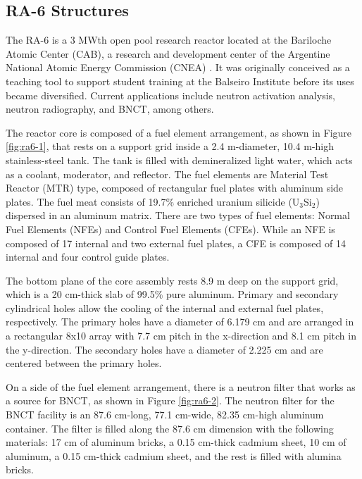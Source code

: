 \subsection{RA-6 Structures}

The RA-6 is a 3 MWth open pool research reactor located at the Bariloche Atomic Center (CAB), a research and development center of the Argentine National Atomic Energy Commission (CNEA) \cite{ICSBEP}.
It was originally conceived as a teaching tool to support student training at the Balseiro Institute before its uses became diversified.
Current applications include neutron activation analysis, neutron radiography, and \gls*{BNCT}, among others.

The reactor core is composed of a fuel element arrangement, as shown in Figure \ref{fig:ra6-1}, that rests on a support grid inside a 2.4 m-diameter, 10.4 m-high stainless-steel tank.
The tank is filled with demineralized light water, which acts as a coolant, moderator, and reflector.
The fuel elements are Material Test Reactor (MTR) type, composed of rectangular fuel plates with aluminum side plates.
The fuel meat consists of 19.7\% enriched uranium silicide (U$_3$Si$_2$) dispersed in an aluminum matrix.
There are two types of fuel elements: Normal Fuel Elements (NFEs) and Control Fuel Elements (CFEs).
While an NFE is composed of 17 internal and two external fuel plates, a CFE is composed of 14 internal and four control guide plates.

The bottom plane of the core assembly rests 8.9 m deep on the support grid, which is a 20 cm-thick slab of 99.5\% pure aluminum.
Primary and secondary cylindrical holes allow the cooling of the internal and external fuel plates, respectively.
The primary holes have a diameter of 6.179 cm and are arranged in a rectangular 8x10 array with 7.7 cm pitch in the x-direction and 8.1 cm pitch in the y-direction.
The secondary holes have a diameter of 2.225 cm and are centered between the primary holes.

On a side of the fuel element arrangement, there is a neutron filter that works as a source for \gls*{BNCT}, as shown in Figure \ref{fig:ra6-2}.
The neutron filter for the \gls*{BNCT} facility is an 87.6 cm-long, 77.1 cm-wide, 82.35 cm-high aluminum container.
The filter is filled along the 87.6 cm dimension with the following materials: 17 cm of aluminum bricks, a 0.15 cm-thick cadmium sheet, 10 cm of aluminum, a 0.15 cm-thick cadmium sheet, and the rest is filled with alumina bricks.

